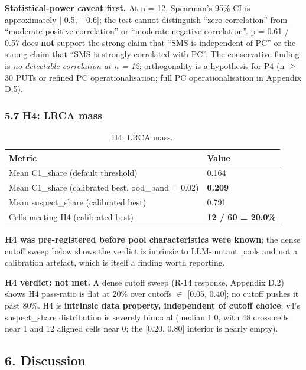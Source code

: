 \documentclass[review,12pt,authoryear]{elsarticle}
\begin{document}
\textbf{Statistical-power caveat first.} At n = 12, Spearman's 95\% CI
is approximately {[}-0.5, +0.6{]}; the test cannot distinguish ``zero
correlation'' from ``moderate positive correlation'' or ``moderate
negative correlation''. p = 0.61 / 0.57 does \textbf{not} support the
strong claim that ``SMS is independent of PC'' or the strong claim that
``SMS is strongly correlated with PC''. The conservative finding is
\emph{no detectable correlation at n = 12}; orthogonality is a
hypothesis for P4 (n $\geq$ 30 PUTs or refined PC operationalisation; full PC
operationalisation in Appendix D.5).

\subsubsection{5.7 H4: LRCA mass}\label{h5-lrca-mass}

{\def\LTcaptype{table} %
\begin{longtable}[]{@{}ll@{}}
\caption{H4: LRCA mass.}\label{tab:p2-13}\\
\toprule\noalign{}
Metric & Value \\
\midrule\noalign{}
\endhead
\bottomrule\noalign{}
\endlastfoot
Mean C1\_share (default threshold) & 0.164 \\
Mean C1\_share (calibrated best, ood\_band = 0.02) & \textbf{0.209} \\
Mean suspect\_share (calibrated best) & 0.791 \\
Cells meeting H4 (calibrated best) & \textbf{12 / 60 = 20.0\%} \\
\end{longtable}
}

\textbf{H4 was pre-registered before pool characteristics were known};
the dense cutoff sweep below shows the verdict is intrinsic to
LLM-mutant pools and not a calibration artefact, which is itself a
finding worth reporting.

\textbf{H4 verdict: not met.} A dense cutoff sweep (R-14 response,
Appendix D.2) shows H4 pass-ratio is flat at 20\% over cutoffs $\in$
{[}0.05, 0.40{]}; no cutoff pushes it past 80\%. H4 is \textbf{intrinsic
data property, independent of cutoff choice}; v4's suspect\_share
distribution is severely bimodal (median 1.0, with 48 cross cells near 1
and 12 aligned cells near 0; the {[}0.20, 0.80{]} interior is nearly
empty).


\subsection{6. Discussion}\label{discussion}
\end{document}
